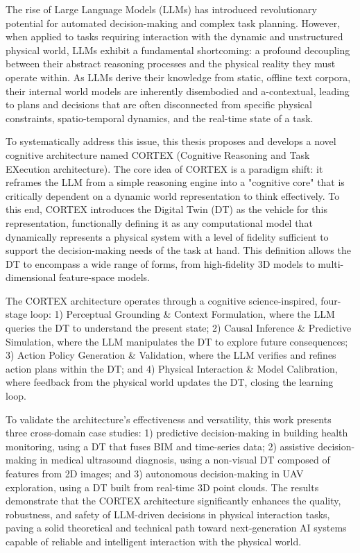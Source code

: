 
The rise of Large Language Models (LLMs) has introduced revolutionary potential for automated decision-making and complex task planning. However, when applied to tasks requiring interaction with the dynamic and unstructured physical world, LLMs exhibit a fundamental shortcoming: a profound decoupling between their abstract reasoning processes and the physical reality they must operate within. As LLMs derive their knowledge from static, offline text corpora, their internal world models are inherently disembodied and a-contextual, leading to plans and decisions that are often disconnected from specific physical constraints, spatio-temporal dynamics, and the real-time state of a task.

To systematically address this issue, this thesis proposes and develops a novel cognitive architecture named CORTEX (Cognitive Reasoning and Task EXecution architecture). The core idea of CORTEX is a paradigm shift: it reframes the LLM from a simple reasoning engine into a "cognitive core" that is critically dependent on a dynamic world representation to think effectively. To this end, CORTEX introduces the Digital Twin (DT) as the vehicle for this representation, functionally defining it as any computational model that dynamically represents a physical system with a level of fidelity sufficient to support the decision-making needs of the task at hand. This definition allows the DT to encompass a wide range of forms, from high-fidelity 3D models to multi-dimensional feature-space models.

The CORTEX architecture operates through a cognitive science-inspired, four-stage loop: 1) Perceptual Grounding \& Context Formulation, where the LLM queries the DT to understand the present state; 2) Causal Inference \& Predictive Simulation, where the LLM manipulates the DT to explore future consequences; 3) Action Policy Generation \& Validation, where the LLM verifies and refines action plans within the DT; and 4) Physical Interaction \& Model Calibration, where feedback from the physical world updates the DT, closing the learning loop.

To validate the architecture's effectiveness and versatility, this work presents three cross-domain case studies: 1) predictive decision-making in building health monitoring, using a DT that fuses BIM and time-series data; 2) assistive decision-making in medical ultrasound diagnosis, using a non-visual DT composed of features from 2D images; and 3) autonomous decision-making in UAV exploration, using a DT built from real-time 3D point clouds. The results demonstrate that the CORTEX architecture significantly enhances the quality, robustness, and safety of LLM-driven decisions in physical interaction tasks, paving a solid theoretical and technical path toward next-generation AI systems capable of reliable and intelligent interaction with the physical world.